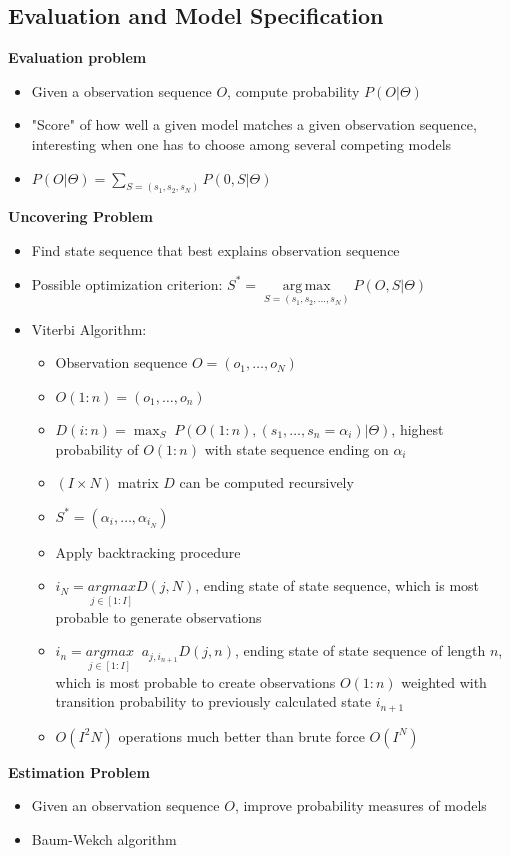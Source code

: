 \documentclass{scrartcl}
\DeclareMathOperator*{\argmax}{arg\,max}
\begin{document}
\subsection*{Evaluation and Model Specification}
\textbf{Evaluation problem}
\begin{itemize}
    \item
        Given a observation sequence $O$, compute probability $P(O|\Theta)$
    \item
        "Score" of how well a given model matches a given observation sequence, interesting when one has to choose among several competing models
    \item
        $P(O|\Theta) = \sum_{S=(s_1, s_2, s_N)} P(0, S|\Theta)$
\end{itemize}
\textbf{Uncovering Problem}
\begin{itemize}
    \item
        Find state sequence that best explains observation sequence 
    \item
        Possible optimization criterion:
        $S^* = \underset{S = (s_1, s_2, \dots, s_N)}{\argmax} P(O,S|\Theta)$
    \item
        Viterbi Algorithm:
        \begin{itemize}
            \item
                Observation sequence $O=(o_1, \dots, o_N)$
            \item
                $O(1:n) = (o_1, \dots, o_n)$
            \item
                $D(i:n) = {\max_S} \; P(O(1:n), (s_1, \dots, s_n=\alpha_i)|\Theta)$, highest probability of $O(1:n)$ with state sequence ending on $\alpha_i$
            \item
                $(I \times N)$ matrix $D$ can be computed recursively\\
            \item
                $ S^* = (\alpha_i, \dots, \alpha_{i_N})$
            \item
                Apply backtracking procedure
            \item
                $i_N = \underset{j \in [1:I]}{argmax} D(j, N)$, ending state of state sequence, which is most probable to generate observations
            \item
                $i_n = \underset{j \in [1:I]}{argmax} \; \; a_{j, i_{n+1}}D(j, n)$, ending state of state sequence of length $n$, which is most probable to create observations $O(1:n)$ weighted with transition probability to previously calculated state $i_{n+1}$\\
            \item
                $O(I^2 N)$ operations much better than brute force $O(I^N)$
        \end{itemize}
\end{itemize}
\textbf{Estimation Problem}
\begin{itemize}
    \item
        Given an observation sequence $O$, improve probability measures of models
    \item
        Baum-Wekch algorithm
\end{itemize}
\end{document}
